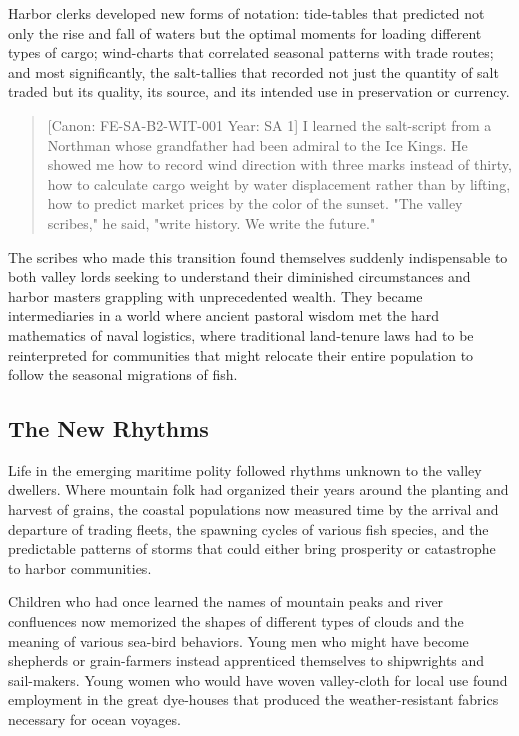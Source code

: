 Harbor clerks developed new forms of notation: tide-tables that
predicted not only the rise and fall of waters but the optimal moments
for loading different types of cargo; wind-charts that correlated
seasonal patterns with trade routes; and most significantly, the
salt-tallies that recorded not just the quantity of salt traded but its
quality, its source, and its intended use in preservation or currency.

\begin{quote}
{[}Canon: FE-SA-B2-WIT-001 \textbar{} Year: SA 1{]} I learned the
salt-script from a Northman whose grandfather had been admiral to the
Ice Kings. He showed me how to record wind direction with three marks
instead of thirty, how to calculate cargo weight by water displacement
rather than by lifting, how to predict market prices by the color of the
sunset. "The valley scribes," he said, "write history. We write the
future."
\end{quote}

The scribes who made this transition found themselves suddenly
indispensable to both valley lords seeking to understand their
diminished circumstances and harbor masters grappling with unprecedented
wealth. They became intermediaries in a world where ancient pastoral
wisdom met the hard mathematics of naval logistics, where traditional
land-tenure laws had to be reinterpreted for communities that might
relocate their entire population to follow the seasonal migrations of
fish.

\subsection{The New Rhythms}\label{the-new-rhythms}

Life in the emerging maritime polity followed rhythms unknown to the
valley dwellers. Where mountain folk had organized their years around
the planting and harvest of grains, the coastal populations now measured
time by the arrival and departure of trading fleets, the spawning cycles
of various fish species, and the predictable patterns of storms that
could either bring prosperity or catastrophe to harbor communities.

Children who had once learned the names of mountain peaks and river
confluences now memorized the shapes of different types of clouds and
the meaning of various sea-bird behaviors. Young men who might have
become shepherds or grain-farmers instead apprenticed themselves to
shipwrights and sail-makers. Young women who would have woven
valley-cloth for local use found employment in the great dye-houses that
produced the weather-resistant fabrics necessary for ocean voyages.

